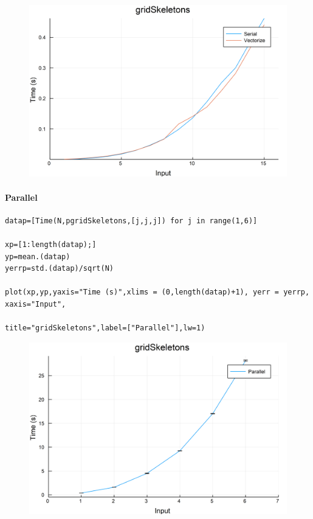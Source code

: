 \documentclass{article}
\begin{document}
\begin{figure}[h!]
\centering
\includegraphics[scale=0.06]{gridSkeletonsCom1.png}
\end{figure}

\paragraph{Parallel}
\begin{flushleft}\small
\begin{list}{}{} \item
    \begin{Verbatim}[tabsize=4]
datap=[Time(N,pgridSkeletons,[j,j,j]) for j in range(1,6)]

xp=[1:length(datap);]
yp=mean.(datap)
yerrp=std.(datap)/sqrt(N)

plot(xp,yp,yaxis="Time (s)",xlims = (0,length(datap)+1), yerr = yerrp, xaxis="Input", 
                                            title="gridSkeletons",label=["Parallel"],lw=1)
    \end{Verbatim}
\end{list}
\end{flushleft}

\begin{figure}[h!]
\centering
\includegraphics[scale=0.06]{gridSkeletonsPar.png}
\end{figure}
\end{document}
